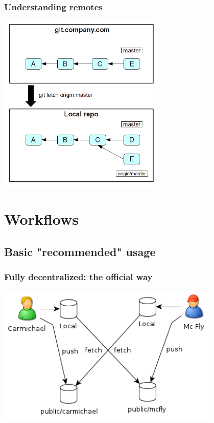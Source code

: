 \documentclass{beamer}
\begin{document}
    \begin{frame}
        \frametitle{Understanding remotes}
        \begin{center}
            \includegraphics[width=0.6\textwidth]{figures/re-fetch.png}
        \end{center}
    \end{frame}


    \section{Workflows}

        \subsection{Basic "recommended" usage}

    \begin{frame}
        \frametitle{Fully decentralized: the official way}
        \begin{center}
            \includegraphics[width=0.8\textwidth]{./figures/repo-official.png}
        \end{center}

    \end{frame}
\end{document}

